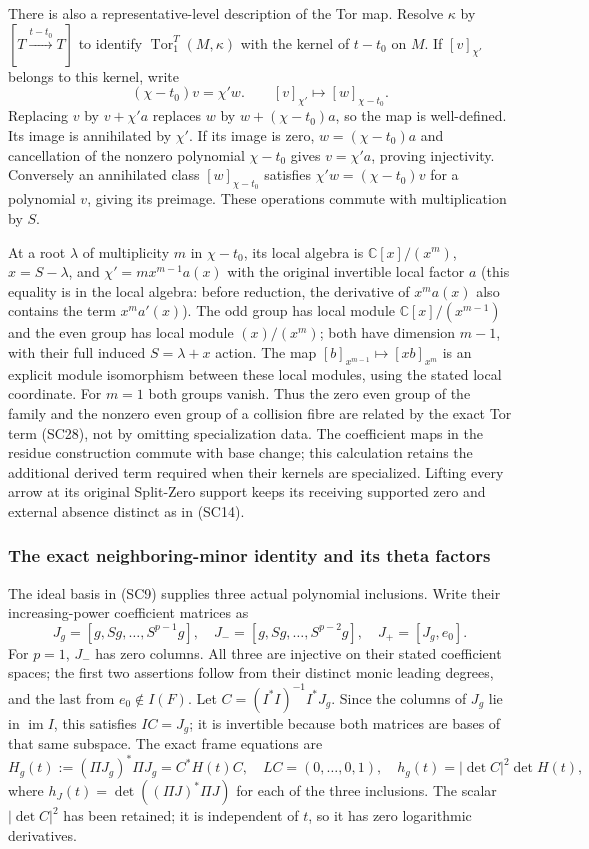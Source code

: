 There is also a representative-level description of the Tor map.
Resolve $\kappa$ by $[T\xrightarrow{t-t_0}T]$ to identify
$\operatorname{Tor}_1^T(M,\kappa)$ with the kernel of $t-t_0$ on
$M$.  If $[v]_{\chi'}$ belongs to this kernel, write
\[
  (\chi-t_0)v=\chi'w.
  \qquad [v]_{\chi'}\longmapsto[w]_{\chi-t_0}.
 \tag{SC30}
\]
Replacing $v$ by $v+\chi'a$ replaces $w$ by $w+(\chi-t_0)a$,
so the map is well-defined.  Its image is annihilated by $\chi'$.
If its image is zero, $w=(\chi-t_0)a$ and cancellation of the
nonzero polynomial $\chi-t_0$ gives $v=\chi'a$, proving
injectivity.  Conversely an annihilated class $[w]_{\chi-t_0}$
satisfies $\chi'w=(\chi-t_0)v$ for a polynomial $v$, giving its
preimage.  These operations commute with multiplication by $S$.

At a root $\lambda$ of multiplicity $m$ in $\chi-t_0$, its local
algebra is $\mathbb C[x]/(x^m)$, $x=S-\lambda$, and
$\chi'=m x^{m-1}a(x)$ with the original invertible local factor
$a$ (this equality is in the local algebra: before reduction,
the derivative of $x^ma(x)$ also contains the term $x^ma'(x)$).
The odd group has local module
$\mathbb C[x]/(x^{m-1})$ and the even group has local module
$(x)/(x^m)$; both have dimension $m-1$, with their full induced
$S=\lambda+x$ action.  The map
$[b]_{x^{m-1}}\mapsto[xb]_{x^m}$ is an explicit module isomorphism
between these local modules, using the stated local coordinate.
For $m=1$ both groups vanish.
Thus the zero even group of the family and the nonzero even group
of a collision fibre are related by the exact Tor term (SC28),
not by omitting specialization data.  The coefficient maps in
the residue construction commute with base change; this calculation
retains the additional derived term required when their kernels
are specialized.  Lifting every arrow at its original Split-Zero
support keeps its receiving supported zero and external absence
distinct as in (SC14).

\subsubsection{The exact neighboring-minor identity and its theta factors}

The ideal basis in (SC9) supplies three actual polynomial inclusions.
Write their increasing-power coefficient matrices as
\[
 J_g=[g,Sg,\ldots,S^{p-1}g],\quad
 J_-=[g,Sg,\ldots,S^{p-2}g],\quad
 J_+=[J_g,e_0].
 \tag{SC31}
\]
For $p=1$, $J_-$ has zero columns.  All three are injective on their
stated coefficient spaces; the first two assertions follow from
their distinct monic leading degrees, and the last from
$e_0\notin I(F)$.  Let
$C=(I^*I)^{-1}I^*J_g$.  Since the columns of $J_g$ lie in
$\operatorname{im}I$, this satisfies $IC=J_g$; it is invertible
because both matrices are bases of that same subspace.  The exact
frame equations are
\[
 H_g(t):=(\Pi J_g)^*\Pi J_g=C^*H(t)C,
 \quad LC=(0,\ldots,0,1),\quad
 h_g(t)=|\det C|^2\det H(t),
 \tag{SC32}
\]
where $h_J(t)=\det((\Pi J)^*\Pi J)$ for each of the three
inclusions.  The scalar $|\det C|^2$ has been retained; it is
independent of $t$, so it has zero logarithmic derivatives.

